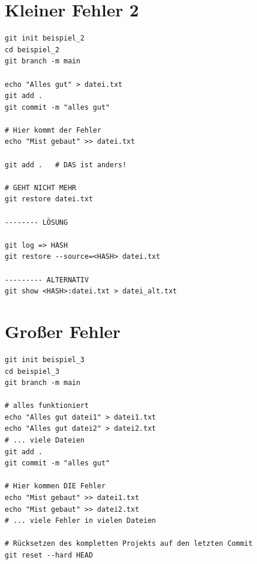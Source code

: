 \documentclass[]{scrreprt}
\begin{document}
\section*{Kleiner Fehler 2}
\begin{lstlisting}
git init beispiel_2
cd beispiel_2
git branch -m main

echo "Alles gut" > datei.txt
git add .
git commit -m "alles gut"

# Hier kommt der Fehler
echo "Mist gebaut" >> datei.txt

git add .   # DAS ist anders!

# GEHT NICHT MEHR
git restore datei.txt  

-------- LÖSUNG

git log => HASH
git restore --source=<HASH> datei.txt 

--------- ALTERNATIV
git show <HASH>:datei.txt > datei_alt.txt

\end{lstlisting}


\section*{Großer Fehler}
\begin{lstlisting}
git init beispiel_3
cd beispiel_3
git branch -m main

# alles funktioniert
echo "Alles gut datei1" > datei1.txt
echo "Alles gut datei2" > datei2.txt
# ... viele Dateien
git add .
git commit -m "alles gut"

# Hier kommen DIE Fehler
echo "Mist gebaut" >> datei1.txt
echo "Mist gebaut" >> datei2.txt
# ... viele Fehler in vielen Dateien

# Rücksetzen des kompletten Projekts auf den letzten Commit 
git reset --hard HEAD 
\end{lstlisting}

\newpage
\end{document}
